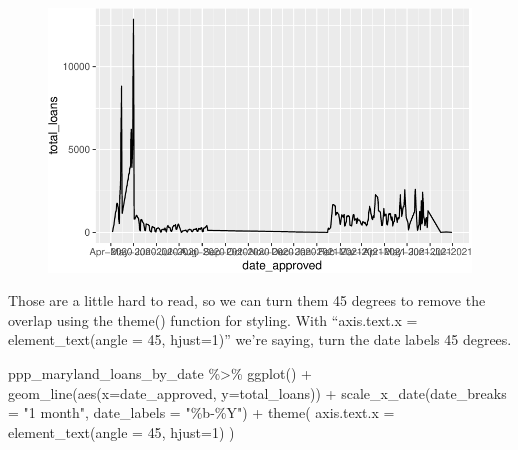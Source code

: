 \documentclass[
  letterpaper,
  DIV=11,
  numbers=noendperiod]{scrreprt}
\newenvironment{Shaded}{\begin{snugshade}}{\end{snugshade}}
\newcommand{\AttributeTok}[1]{\textcolor[rgb]{0.40,0.45,0.13}{#1}}
\newcommand{\DecValTok}[1]{\textcolor[rgb]{0.68,0.00,0.00}{#1}}
\newcommand{\FunctionTok}[1]{\textcolor[rgb]{0.28,0.35,0.67}{#1}}
\newcommand{\NormalTok}[1]{\textcolor[rgb]{0.00,0.23,0.31}{#1}}
\newcommand{\SpecialCharTok}[1]{\textcolor[rgb]{0.37,0.37,0.37}{#1}}
\newcommand{\StringTok}[1]{\textcolor[rgb]{0.13,0.47,0.30}{#1}}
\begin{document}
\begin{figure}[H]

{\centering \includegraphics{./visualizing-for-reporting_files/figure-pdf/unnamed-chunk-14-1.pdf}

}

\end{figure}

Those are a little hard to read, so we can turn them 45 degrees to
remove the overlap using the theme() function for styling. With
``axis.text.x = element\_text(angle = 45, hjust=1)'' we're saying, turn
the date labels 45 degrees.

\begin{Shaded}
\begin{Highlighting}[]
\NormalTok{ppp\_maryland\_loans\_by\_date }\SpecialCharTok{\%\textgreater{}\%}
  \FunctionTok{ggplot}\NormalTok{() }\SpecialCharTok{+}
  \FunctionTok{geom\_line}\NormalTok{(}\FunctionTok{aes}\NormalTok{(}\AttributeTok{x=}\NormalTok{date\_approved, }\AttributeTok{y=}\NormalTok{total\_loans)) }\SpecialCharTok{+}
  \FunctionTok{scale\_x\_date}\NormalTok{(}\AttributeTok{date\_breaks =} \StringTok{"1 month"}\NormalTok{, }\AttributeTok{date\_labels =} \StringTok{"\%b{-}\%Y"}\NormalTok{) }\SpecialCharTok{+}
  \FunctionTok{theme}\NormalTok{(}
    \AttributeTok{axis.text.x =} \FunctionTok{element\_text}\NormalTok{(}\AttributeTok{angle =} \DecValTok{45}\NormalTok{,  }\AttributeTok{hjust=}\DecValTok{1}\NormalTok{)}
\NormalTok{  )}
\end{Highlighting}
\end{Shaded}
\end{document}
